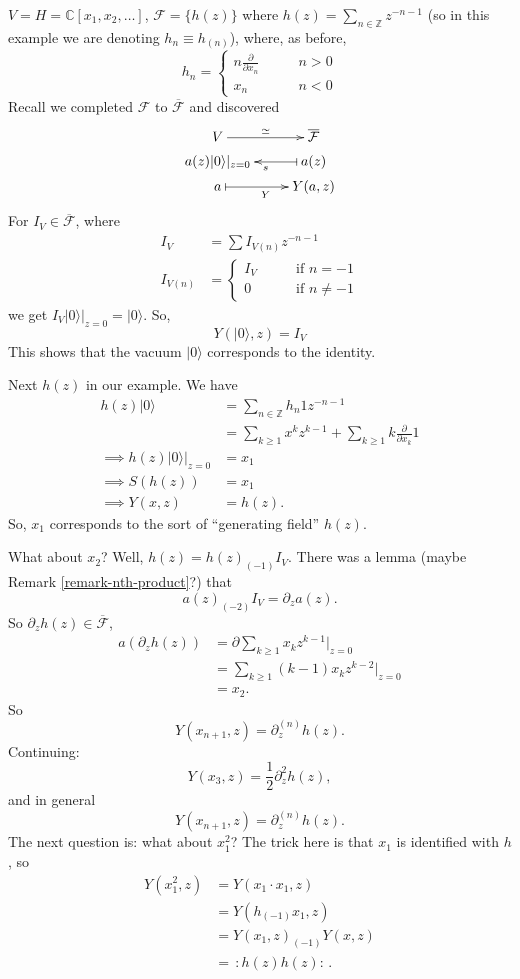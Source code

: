 \begin{example}
\label{example-heise-verte-algeb-defin}
$V=H=\mathbb{C}[x_1,x_2,\ldots]$,
$\mathcal{F}=\{h(z)\}$ where
$h(z)=\sum_{n \in \mathbb{Z}}z^{-n-1}$ (so in
this example we are denoting
$h_n \equiv h_{(n)}$), where, as before,
$$
h_n=\begin{cases}
n\frac{\partial }{\partial x_n}\qquad &n>0 \\
x_n\qquad &n<0
\end{cases}
$$
Recall we completed $\mathcal{F}$ to
$\overline{\mathcal{F}}$
and discovered
$$
\xymatrix@R=0.2 em{
V\ar[r]^{\simeq}&\overline{\mathcal{F}}\\
a(z)|0\rangle |_{z=0}&a(z)\ar@{|->}[l]^s\\
a \ar@{|->}[r]_Y&Y(a,z)
}
$$
For $I_V \in \overline{\mathcal{F}}$,
where
 \begin{align*}
I_V&=\sum I_{V(n)}z^{-n-1}\\
I_{V(n)}&=\begin{cases}
I_V\qquad &\text{if }n=-1 \\
0\qquad &\text{if }n \neq -1
\end{cases}
\end{align*}
we get $I_V |0\rangle|_{z=0}=|0\rangle$. So,
$$
Y(|0\rangle,z)=I_V
$$
This shows that the vacuum $|0\rangle$
corresponds to the identity.

Next $h(z)$ in our example. We have
$$
\begin{aligned}
h(z)|0\rangle&=\sum_{ n \in \mathbb{Z}}h_n
1z^{-n-1}\\
&=\sum_{ k \geq 1}x^kz^{k-1}+\sum_{k \geq
1}k\frac{\partial }{\partial x_k}1\\
\implies h(z)|0\rangle|_{z=0}&=x_1\\
\implies S(h(z))&=x_1\\
\implies Y(x,z)&=h(z).
\end{aligned}
$$
So, $x_1$ corresponds to the sort of
``generating field'' $h(z)$.

What about $x_2$? Well,
$h(z)=h(z)_{(-1)}I_V$.
There was a lemma (maybe Remark
\ref{remark-nth-product}?) that
$$
a(z)_{(-2)}I_V=\partial_za(z).
$$
So $\partial_zh(z) \in
\overline{\mathcal{F}}$,
$$
\begin{aligned}
a(\partial_zh(z))&=\partial \sum_{k \geq
1}x_kz^{k-1}\Big|_{z=0}\\
&=\sum_{k\geq 1}(k-1)x_kz^{k-2}\Big|_{z=0}\\
&=x_2.
\end{aligned}
$$
So
$$
Y(x_{n+1},z)=\partial_z^{(n)}h(z).
$$
Continuing:
$$
Y(x_3,z)=\frac{1}{2}\partial_z^2h(z),
$$
and in general
$$
Y(x_{n+1},z)=\partial_z^{(n)}h(z).
$$
The next question is: what about $x_1^2$?
The trick here is that $x_1$ is identified
with $h$, so
$$
\begin{aligned}
Y(x_1^2,z)&=Y(x_1\cdot x_1,z)\\
&=Y(h_{(-1)}x_1,z)\\
&=Y(x_1,z)_{(-1)}Y(x,z)\\
&=\,:\!h(z)h(z)\!:\,.
\end{aligned}
$$


\end{example}
